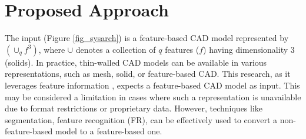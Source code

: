 \section{Proposed Approach}
\label{sec:approach}

The input (Figure \ref{fig_sysarch}) is a feature-based CAD model represented by $(\cup_q f^3)$, where $\cup$ denotes a collection of $q$ features ($f$) having dimensionality $3$ (solids). In practice, thin-walled CAD models can be available in various representations, such as mesh, solid, or feature-based CAD. This research, as it leverages feature information \cite{YogeshCOEP2013}, expects a feature-based CAD model as input. This may be considered a limitation in cases where such a representation is unavailable due to format restrictions or proprietary data. However, techniques like segmentation, feature recognition (FR), can be effectively used to convert a non-feature-based model to a feature-based one.


